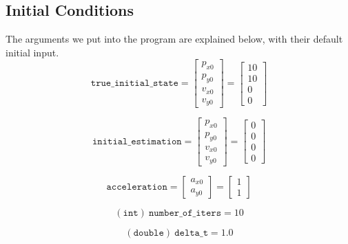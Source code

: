 \documentclass[12pt]{article}
\begin{document}
	\subsection{Initial Conditions}\label{sub:Initial Conditions}
	The arguments we put into the program are explained below, with their default initial input.
	\begin{equation}
		\mathtt{true\_initial\_state}=
		\begin{bmatrix}
			p_{x0} \\ p_{y0} \\ v_{x0} \\ v_{y0}
		\end{bmatrix}=
		\begin{bmatrix}
			10 \\ 10 \\ 0 \\ 0
		\end{bmatrix}
	\end{equation}

	\begin{equation}
		\mathtt{initial\_estimation}=
		\begin{bmatrix}
			p_{x0} \\ p_{y0} \\ v_{x0} \\ v_{y0}
		\end{bmatrix}=
		\begin{bmatrix}
			0 \\ 0 \\ 0 \\ 0
		\end{bmatrix}
	\end{equation}

	\begin{equation}
			\mathtt{acceleration}=
			\begin{bmatrix}
				a_{x0} \\ a_{y0}
			\end{bmatrix}=
			\begin{bmatrix}
				1 \\ 1
			\end{bmatrix}
	\end{equation}

	\begin{equation}
			(\mathtt{int})\ \mathtt{number\_of\_iters}=10
	\end{equation}

	\begin{equation}
			(\mathtt{double})\ \mathtt{delta\_t}=1.0
	\end{equation}
\end{document}
